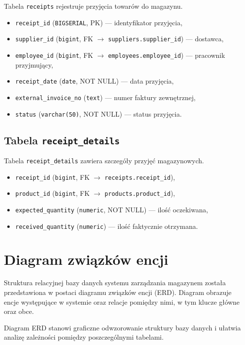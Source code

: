 Tabela \texttt{receipts} rejestruje przyjęcia towarów do magazynu.
\begin{itemize}
    \item \texttt{receipt\_id} (\texttt{BIGSERIAL}, PK) — identyfikator przyjęcia,
    \item \texttt{supplier\_id} (\texttt{bigint}, FK $\rightarrow$ \texttt{suppliers.supplier\_id}) — dostawca,
    \item \texttt{employee\_id} (\texttt{bigint}, FK $\rightarrow$ \texttt{employees.employee\_id}) — pracownik przyjmujący,
    \item \texttt{receipt\_date} (\texttt{date}, NOT NULL) — data przyjęcia,
    \item \texttt{external\_invoice\_no} (\texttt{text}) — numer faktury zewnętrznej,
    \item \texttt{status} (\texttt{varchar(50)}, NOT NULL) — status przyjęcia.
\end{itemize}

\subsection{Tabela \texttt{receipt\_details}}

Tabela \texttt{receipt\_details} zawiera szczegóły przyjęć magazynowych.
\begin{itemize}
    \item \texttt{receipt\_id} (\texttt{bigint}, FK $\rightarrow$ \texttt{receipts.receipt\_id}),
    \item \texttt{product\_id} (\texttt{bigint}, FK $\rightarrow$ \texttt{products.product\_id}),
    \item \texttt{expected\_quantity} (\texttt{numeric}, NOT NULL) — ilość oczekiwana,
    \item \texttt{received\_quantity} (\texttt{numeric}) — ilość faktycznie otrzymana.
\end{itemize}

\section{Diagram związków encji}

Struktura relacyjnej bazy danych systemu zarządzania magazynem
została przedstawiona w postaci diagramu związków encji (ERD).
Diagram obrazuje encje występujące w systemie oraz relacje
pomiędzy nimi, w tym klucze główne oraz obce.

Diagram ERD stanowi graficzne odwzorowanie struktury bazy danych
i ułatwia analizę zależności pomiędzy poszczególnymi tabelami.

